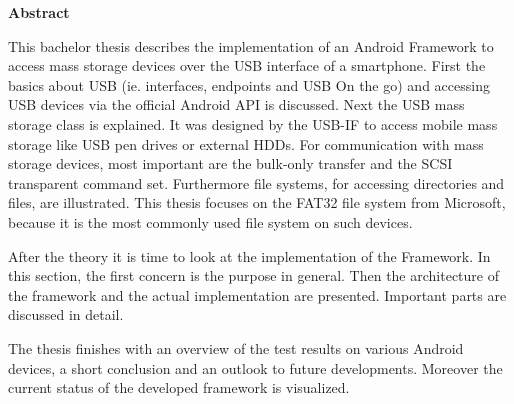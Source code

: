 

\clearemptydoublepage
{}
{}	





\vspace*{2cm}
\begin{center}
{\Large \bf Abstract}
\end{center}
\vspace{1cm}

This bachelor thesis describes the implementation of an Android Framework to access mass storage devices over the USB interface of a smartphone. First the basics about USB (ie. interfaces, endpoints and USB On the go) and accessing USB devices via the official Android API is discussed. Next the USB mass storage class is explained. It was designed by the USB-IF to access mobile mass storage like USB pen drives or external HDDs. For communication with mass storage devices, most important are the bulk-only transfer and the SCSI transparent command set. Furthermore file systems, for accessing directories and files, are illustrated. This thesis focuses on the FAT32 file system from Microsoft, because it is the most commonly used file system on such devices.

After the theory it is time to look at the implementation of the Framework. In this section, the first concern is the purpose in general. Then the architecture of the framework and the actual implementation are presented. Important parts are discussed in detail.

The thesis finishes with an overview of the test results on various Android devices, a short conclusion and an outlook to future developments. Moreover the current status of the developed framework is visualized. 